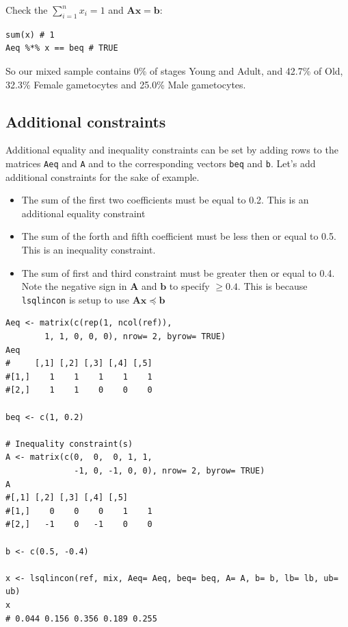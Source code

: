 \documentclass[11pt, fleqn]{article}
\begin{document}
Check the $\sum_{i=1}^{n} x_{i} = 1$ and $\mathbf{Ax} = \mathbf{b}$:

\begin{Verbatim}[formatcom=\color{violet}, fontsize=\small]
sum(x) # 1
Aeq %*% x == beq # TRUE
\end{Verbatim}

So our mixed sample contains 0\% of stages Young and Adult, and 42.7\% of Old,
32.3\% Female gametocytes and 25.0\% Male gametocytes.

\subsection{Additional constraints}

Additional equality and inequality constraints can be set by adding rows to the
matrices \texttt{Aeq} and \texttt{A} and to the corresponding vectors
\texttt{beq} and \texttt{b}.  Let's add additional constraints for the sake of
example. 

\begin{itemize}
    \item The sum of the first two coefficients must be equal to 0.2. This is an
        additional equality constraint
    \item The sum of the forth and fifth coefficient must be less then or equal to 0.5. This is an inequality constraint.
    \item The sum of first and third constraint must be greater then or equal to 0.4. Note the negative sign in $\mathbf{A}$ and $\mathbf{b}$ to specify $\geq 0.4$. 
        This is because \texttt{lsqlincon} is setup to use $\mathbf{Ax} \preceq \mathbf{b}$
\end{itemize}

\begin{Verbatim}[formatcom=\color{violet}, fontsize=\small]
Aeq <- matrix(c(rep(1, ncol(ref)), 
        1, 1, 0, 0, 0), nrow= 2, byrow= TRUE)
Aeq
#     [,1] [,2] [,3] [,4] [,5]
#[1,]    1    1    1    1    1
#[2,]    1    1    0    0    0

beq <- c(1, 0.2)

# Inequality constraint(s)
A <- matrix(c(0,  0,  0, 1, 1,
              -1, 0, -1, 0, 0), nrow= 2, byrow= TRUE) 
A
#[,1] [,2] [,3] [,4] [,5]
#[1,]    0    0    0    1    1
#[2,]   -1    0   -1    0    0

b <- c(0.5, -0.4)

x <- lsqlincon(ref, mix, Aeq= Aeq, beq= beq, A= A, b= b, lb= lb, ub= ub)
x
# 0.044 0.156 0.356 0.189 0.255
\end{Verbatim}
\end{document}
